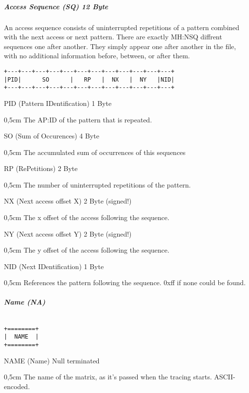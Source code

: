 \subparagraph{Access Sequence (SQ) 12 Byte}$\;$ \\

An access sequence consists of uninterrupted repetitions of a pattern combined with the next access or next 
pattern. There are exactly MH:NSQ diffrent sequences one after another. They simply appear one after another 
in the file, with no additional information before, between, or after them.
\begin{verbatim}
+---+---+---+---+---+---+---+---+---+---+---+---+
|PID|      SO      |   RP   |  NX   |  NY   |NID|
+---+---+---+---+---+---+---+---+---+---+---+---+
\end{verbatim}
PID (Pattern IDentification) 1 Byte
\begin{addmargin}[0,5cm]{0,5cm} 
	The AP:ID of the pattern that is repeated.
\end{addmargin}
SO (Sum of Occurences) 4 Byte
\begin{addmargin}[0,5cm]{0,5cm} 
	The accumulated sum of occurrences of this sequences
\end{addmargin}
RP (RePetitions) 2 Byte
\begin{addmargin}[0,5cm]{0,5cm} 
	The number of uninterrupted repetitions of the pattern.
\end{addmargin}
NX (Next access offset X) 2 Byte (signed!)
\begin{addmargin}[0,5cm]{0,5cm} 
	The x offset of the access following the sequence.
\end{addmargin}
NY (Next access offset Y) 2 Byte (signed!)
\begin{addmargin}[0,5cm]{0,5cm} 
	The y offset of the access following the sequence.
\end{addmargin}
NID (Next IDentification) 1 Byte
\begin{addmargin}[0,5cm]{0,5cm} 
	References the pattern following the sequence. 0xff if none could be found.
\end{addmargin}

\subparagraph{Name (NA)}$\;$ \\
\begin{verbatim}
+========+
|  NAME  |
+========+
\end{verbatim}
NAME (Name) Null terminated
\begin{addmargin}[0,5cm]{0,5cm} 
	The name of the matrix, as it's passed when the tracing starts. ASCII-encoded.
\end{addmargin}